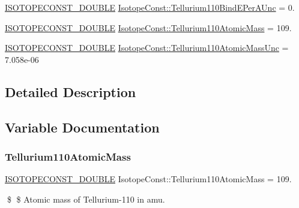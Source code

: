 \begin{DoxyCompactItemize}
\mbox{\hyperlink{group___isotope_const-_macros_ga8f45a7272ce02c0b4c65c44636ed719a}{I\+S\+O\+T\+O\+P\+E\+C\+O\+N\+S\+T\+\_\+\+D\+O\+U\+B\+LE}} \mbox{\hyperlink{group___isotope_const-_tellurium-_te110_ga7dc6442fbca369e3f116ccc0f2772512}{Isotope\+Const\+::\+Tellurium110\+Bind\+E\+Per\+A\+Unc}} = 0.
\item 
\mbox{\hyperlink{group___isotope_const-_macros_ga8f45a7272ce02c0b4c65c44636ed719a}{I\+S\+O\+T\+O\+P\+E\+C\+O\+N\+S\+T\+\_\+\+D\+O\+U\+B\+LE}} \mbox{\hyperlink{group___isotope_const-_tellurium-_te110_ga1890de01c44fac113369a9ffc2728305}{Isotope\+Const\+::\+Tellurium110\+Atomic\+Mass}} = 109.
\item 
\mbox{\hyperlink{group___isotope_const-_macros_ga8f45a7272ce02c0b4c65c44636ed719a}{I\+S\+O\+T\+O\+P\+E\+C\+O\+N\+S\+T\+\_\+\+D\+O\+U\+B\+LE}} \mbox{\hyperlink{group___isotope_const-_tellurium-_te110_ga7dc37e60f1370883fb39f35492bf32ef}{Isotope\+Const\+::\+Tellurium110\+Atomic\+Mass\+Unc}} = 7.\+058e-\/06
\end{DoxyCompactItemize}


\subsection{Detailed Description}


\subsection{Variable Documentation}
\mbox{\label{group___isotope_const-_tellurium-_te110_ga1890de01c44fac113369a9ffc2728305}} 
\subsubsection{\texorpdfstring{Tellurium110\+Atomic\+Mass}{Tellurium110AtomicMass}}
{\footnotesize\ttfamily \mbox{\hyperlink{group___isotope_const-_macros_ga8f45a7272ce02c0b4c65c44636ed719a}{I\+S\+O\+T\+O\+P\+E\+C\+O\+N\+S\+T\+\_\+\+D\+O\+U\+B\+LE}} Isotope\+Const\+::\+Tellurium110\+Atomic\+Mass = 109.}

\$ \$ Atomic mass of Tellurium-\/110 in amu. \mbox{\label{group___isotope_const-_tellurium-_te110_ga7dc37e60f1370883fb39f35492bf32ef}} 
